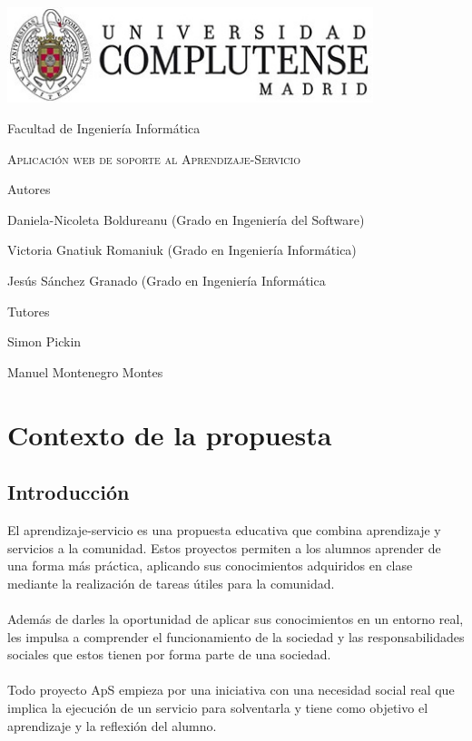 \documentclass[11pt]{article}
\begin{document}
\begin{titlepage}
	\centering
	{\includegraphics[width=0.8\textwidth]{logo}\par}
	\vspace{1cm}
	{\Large Facultad de Ingeniería Informática \par}
	\vspace{3cm}
	{\scshape\Huge Aplicación web de soporte al Aprendizaje-Servicio \par}
	\vspace{5cm}
	{\textbf\Large Autores \par}
	{\Large Daniela-Nicoleta Boldureanu (Grado en Ingeniería del Software)\par}
	{\Large Victoria Gnatiuk Romaniuk (Grado en Ingeniería Informática)\par}
	{\Large Jesús Sánchez Granado (Grado en Ingeniería Informática\par}
	\vspace{1cm}
	{\textbf\Large Tutores \par}
	{\Large Simon Pickin \par}
	{\Large Manuel Montenegro Montes \par}
	
\end{titlepage}

\tableofcontents
\newpage
\listoffigures
\section{Contexto de la propuesta}
\subsection{Introducción}
El aprendizaje-servicio es una propuesta educativa que combina aprendizaje y servicios a la comunidad.  Estos proyectos permiten a los alumnos aprender de una forma más práctica, aplicando sus conocimientos adquiridos en clase mediante la realización de tareas útiles para la comunidad. \\\\
Además de darles la oportunidad de aplicar sus conocimientos en un entorno real, les impulsa a comprender el funcionamiento de la sociedad y las responsabilidades sociales que estos tienen por forma parte de una sociedad.\\\\
Todo proyecto ApS empieza por una iniciativa con una necesidad social real que implica la ejecución de un servicio para solventarla y tiene como objetivo el aprendizaje y la reflexión del alumno.
\end{document}
